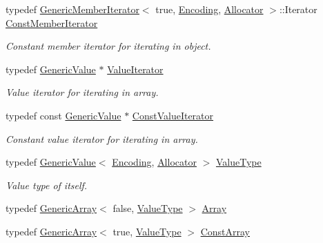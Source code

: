 \begin{DoxyCompactItemize}
typedef \mbox{\hyperlink{classrapidjson_1_1_generic_member_iterator}{Generic\+Member\+Iterator}}$<$ true, \mbox{\hyperlink{classrapidjson_1_1_encoding}{Encoding}}, \mbox{\hyperlink{classrapidjson_1_1_allocator}{Allocator}} $>$\+::Iterator \mbox{\hyperlink{classrapidjson_1_1_generic_value_a6cd2b09795c48d2892bebc0ae350d51f}{Const\+Member\+Iterator}}
\begin{DoxyCompactList}\small\item\em Constant member iterator for iterating in object. \end{DoxyCompactList}\item 
typedef \mbox{\hyperlink{classrapidjson_1_1_generic_value}{Generic\+Value}} $\ast$ \mbox{\hyperlink{classrapidjson_1_1_generic_value_a06ce0e14ec83b53c83e1b1699b53a25e}{Value\+Iterator}}
\begin{DoxyCompactList}\small\item\em Value iterator for iterating in array. \end{DoxyCompactList}\item 
typedef const \mbox{\hyperlink{classrapidjson_1_1_generic_value}{Generic\+Value}} $\ast$ \mbox{\hyperlink{classrapidjson_1_1_generic_value_a89a6588121742fc3f154b10b8f15f45f}{Const\+Value\+Iterator}}
\begin{DoxyCompactList}\small\item\em Constant value iterator for iterating in array. \end{DoxyCompactList}\item 
typedef \mbox{\hyperlink{classrapidjson_1_1_generic_value}{Generic\+Value}}$<$ \mbox{\hyperlink{classrapidjson_1_1_encoding}{Encoding}}, \mbox{\hyperlink{classrapidjson_1_1_allocator}{Allocator}} $>$ \mbox{\hyperlink{classrapidjson_1_1_generic_value_ad2935191ab28c2c2e472b739a9d58202}{Value\+Type}}
\begin{DoxyCompactList}\small\item\em Value type of itself. \end{DoxyCompactList}\item 
typedef \mbox{\hyperlink{classrapidjson_1_1_generic_array}{Generic\+Array}}$<$ false, \mbox{\hyperlink{classrapidjson_1_1_generic_value_ad2935191ab28c2c2e472b739a9d58202}{Value\+Type}} $>$ \mbox{\hyperlink{classrapidjson_1_1_generic_value_a81291ad1031afe43aca4719e2989d7dc}{Array}}
\item 
typedef \mbox{\hyperlink{classrapidjson_1_1_generic_array}{Generic\+Array}}$<$ true, \mbox{\hyperlink{classrapidjson_1_1_generic_value_ad2935191ab28c2c2e472b739a9d58202}{Value\+Type}} $>$ \mbox{\hyperlink{classrapidjson_1_1_generic_value_a8fb89523de7b22be0c69069f05d04b41}{Const\+Array}}

\end{DoxyCompactItemize}
